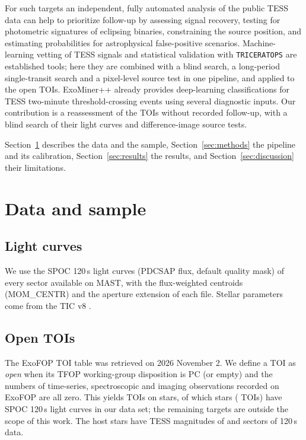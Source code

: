 \documentclass{aastex701}
\begin{document}
For such targets an independent, fully automated analysis of the public TESS data can help to
prioritize follow-up by assessing signal recovery, testing for photometric signatures of eclipsing
binaries, constraining the source position, and estimating probabilities for astrophysical
false-positive scenarios. Machine-learning vetting of TESS signals
\citep[e.g.][]{Yu2019,Tey2023,Valizadegan2022} and statistical validation with
\texttt{TRICERATOPS} \citep{Giacalone2021} are established tools; here they are combined with a
blind search, a long-period single-transit search and a pixel-level source test in one
pipeline, and applied to the open TOIs. ExoMiner++ \citep{Valizadegan2025} already provides
deep-learning classifications for TESS two-minute threshold-crossing events using several
diagnostic inputs. Our contribution is a reassessment of the TOIs without recorded follow-up,
with a blind search of their light curves and difference-image source tests.

Section~\ref{sec:data} describes the data and the sample, Section~\ref{sec:methods} the pipeline and
its calibration, Section~\ref{sec:results} the results, and Section~\ref{sec:discussion} their
limitations.

\section{Data and sample}\label{sec:data}

\subsection{Light curves}
We use the SPOC \citep{Jenkins2016} 120\,s light curves (PDCSAP flux, default quality mask) of every
sector available on MAST, with the flux-weighted centroids (MOM\_CENTR) and the aperture extension of
each file. Stellar parameters come from the TIC v8 \citep{Stassun2019}.

\subsection{Open TOIs}
The ExoFOP TOI table was retrieved on 2026 November 2. We define a TOI as \emph{open} when its TFOP
working-group disposition is PC (or empty) and the numbers of time-series, spectroscopic and imaging
observations recorded on ExoFOP are all zero. This yields \nOpenAll{} TOIs on
\nOpenStarsAll{} stars, of which \nStars{} stars
(\nOpen{} TOIs) have SPOC 120\,s light curves in our data set; the remaining targets are
outside the scope of this work. The host stars have TESS magnitudes of
\tmagRange{} and \sectorRange{} sectors of 120\,s data.
\end{document}
